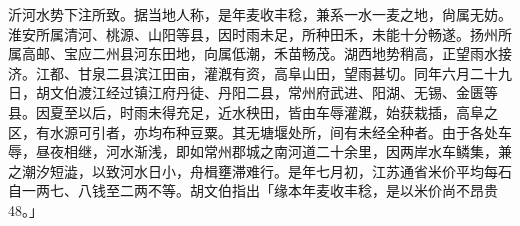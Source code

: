 

\noindent 沂河水势下注所致。据当地人称，是年麦收丰稔，兼系一水一麦之地，尙属无妨。淮安所属清河、桃源、山阳等县，因时雨未足，所种田禾，未能十分畅遂。扬州所属高邮、宝应二州县河东田地，向属低潮，禾苗畅茂。湖西地势稍高，正望雨水接济。江都、甘泉二县滨江田亩，灌漑有资，高阜山田，望雨甚切。同年六月二十九日，胡文伯渡江经过镇江府丹徒、丹阳二县，常州府武进、阳湖、无锡、金匮等县。因夏至以后，时雨未得充足，近水秧田，皆由车辱灌漑，始获栽插，高阜之区，有水源可引者，亦均布种豆粟。其无塘堰处所，间有未经全种者。由于各处车辱，昼夜相继，河水渐浅，即如常州郡城之南河道二十余里，因两岸水车鳞集，兼之潮汐短澁，以致河水日小，舟楫壅滞难行。是年七月初，江苏通省米价平均每石自一两七、八钱至二两不等。胡文伯指出「缘本年麦收丰稔，是以米价尚不昂贵48。」

